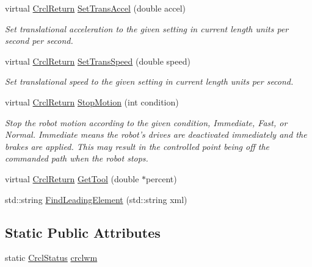\begin{DoxyCompactItemize}
virtual \hyperlink{namespaceCrcl_a1ed3b29723118a020251dde9b12733c0}{Crcl\-Return} \hyperlink{classCrcl_1_1CrclDelegateInterface_a897b31164e969c95bc8e0ba516c0aca8}{Set\-Trans\-Accel} (double accel)
\begin{DoxyCompactList}\small\item\em Set translational acceleration to the given setting in current length units per second per second. \end{DoxyCompactList}\item 
virtual \hyperlink{namespaceCrcl_a1ed3b29723118a020251dde9b12733c0}{Crcl\-Return} \hyperlink{classCrcl_1_1CrclDelegateInterface_a957f09eff572d3175cd045c492f521b6}{Set\-Trans\-Speed} (double speed)
\begin{DoxyCompactList}\small\item\em Set translational speed to the given setting in current length units per second. \end{DoxyCompactList}\item 
virtual \hyperlink{namespaceCrcl_a1ed3b29723118a020251dde9b12733c0}{Crcl\-Return} \hyperlink{classCrcl_1_1CrclDelegateInterface_a0f1326fca669d46ea7be5ac08c59f645}{Stop\-Motion} (int condition)
\begin{DoxyCompactList}\small\item\em Stop the robot motion according to the given condition, Immediate, Fast, or Normal. Immediate means the robot's drives are deactivated immediately and the brakes are applied. This may result in the controlled point being off the commanded path when the robot stops. \end{DoxyCompactList}\item 
virtual \hyperlink{namespaceCrcl_a1ed3b29723118a020251dde9b12733c0}{Crcl\-Return} \hyperlink{classCrcl_1_1CrclDelegateInterface_afcee182e23a8ea376fa1fa829336feb0}{Get\-Tool} (double $\ast$percent)
\item 
std\-::string \hyperlink{classCrcl_1_1CrclDelegateInterface_a48005fdb22d24e47fe059a5085a34eed}{Find\-Leading\-Element} (std\-::string xml)
\end{DoxyCompactItemize}
\subsection*{Static Public Attributes}
\begin{DoxyCompactItemize}
\item 
static \hyperlink{structCrcl_1_1CrclStatus}{Crcl\-Status} \hyperlink{classCrcl_1_1CrclDelegateInterface_a18d6ff1b51227f0424f2611804bed4bd}{crclwm}
\end{DoxyCompactItemize}


